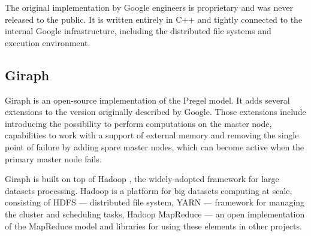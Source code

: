 The original implementation by Google engineers is proprietary and was never released to the public. It is written entirely in C++ and tightly connected to the internal Google infrastructure, including the distributed file systems and execution environment.

\subsection{Giraph}

Giraph \cite{giraph} is an open-source implementation of the Pregel model. It adds several extensions to the version originally described by Google. Those extensions include introducing the possibility to perform computations on the master node, capabilities to work with a support of external memory and removing the single point of failure by adding spare master nodes, which can become active when the primary master node fails.

Giraph is built on top of Hadoop \cite{hadoop}, the widely-adopted framework for large datasets processing. Hadoop is a platform for big datasets computing at scale, consisting of HDFS --- distributed file system, YARN --- framework for managing the cluster and scheduling tasks, Hadoop MapReduce --- an open implementation of the MapReduce model and libraries for using these elements in other projects.
 
